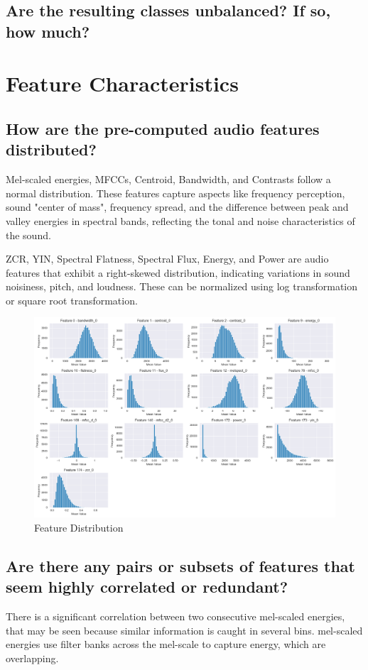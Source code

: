 \documentclass{article}
\begin{document}
\subsection{Are the resulting classes unbalanced? If so, how much?}


\section{Feature Characteristics}
\label{sec:headings}

\subsection{How are the pre-computed audio features distributed?}
Mel-scaled energies, MFCCs, Centroid, Bandwidth, and Contrasts follow a normal distribution. These features capture aspects like frequency perception, sound "center of mass", frequency spread, and the difference between peak and valley energies in spectral bands, reflecting the tonal and noise characteristics of the sound.

ZCR, YIN, Spectral Flatness, Spectral Flux, Energy, and Power are audio features that exhibit a right-skewed distribution, indicating variations in sound noisiness, pitch, and loudness. These can be normalized using log transformation or square root transformation.

\begin{figure}
\centering
\includegraphics[width=0.8\linewidth]{IMG/3a.png}
\caption{Feature Distribution}
\label{fig:3a}
\end{figure}


\subsection{Are there any pairs or subsets of features that seem highly correlated or
redundant?}
There is a significant correlation between two consecutive mel-scaled energies, that may be seen because similar information is caught in several bins. mel-scaled energies use filter banks across the mel-scale to capture energy, which are overlapping.
\end{document}
